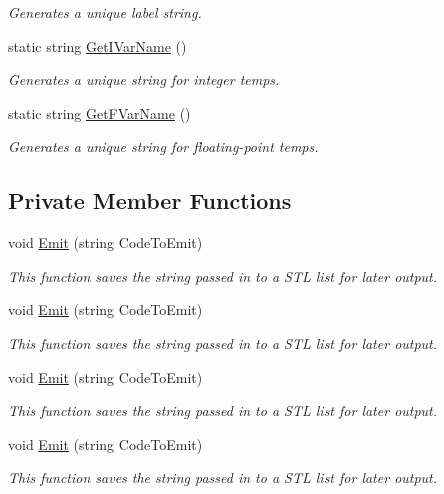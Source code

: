 \begin{DoxyCompactItemize}
\begin{DoxyCompactList}\small\item\em Generates a unique label string. \end{DoxyCompactList}\item 
\hypertarget{classTAC__Generator_a7a604278c753cac6332ed772de9f12ea}{static string \hyperlink{classTAC__Generator_a7a604278c753cac6332ed772de9f12ea}{Get\-I\-Var\-Name} ()}\label{classTAC__Generator_a7a604278c753cac6332ed772de9f12ea}

\begin{DoxyCompactList}\small\item\em Generates a unique string for integer temps. \end{DoxyCompactList}\item 
\hypertarget{classTAC__Generator_a1765369ef41d28a615bf3c50aded0319}{static string \hyperlink{classTAC__Generator_a1765369ef41d28a615bf3c50aded0319}{Get\-F\-Var\-Name} ()}\label{classTAC__Generator_a1765369ef41d28a615bf3c50aded0319}

\begin{DoxyCompactList}\small\item\em Generates a unique string for floating-\/point temps. \end{DoxyCompactList}\end{DoxyCompactItemize}
\subsection*{Private Member Functions}
\begin{DoxyCompactItemize}
\item 
void \hyperlink{classTAC__Generator_a8612e9fba451f0416e717dcf51a02977}{Emit} (string Code\-To\-Emit)
\begin{DoxyCompactList}\small\item\em This function saves the string passed in to a S\-T\-L list for later output. \end{DoxyCompactList}\item 
void \hyperlink{classTAC__Generator_a8612e9fba451f0416e717dcf51a02977}{Emit} (string Code\-To\-Emit)
\begin{DoxyCompactList}\small\item\em This function saves the string passed in to a S\-T\-L list for later output. \end{DoxyCompactList}\item 
void \hyperlink{classTAC__Generator_a8612e9fba451f0416e717dcf51a02977}{Emit} (string Code\-To\-Emit)
\begin{DoxyCompactList}\small\item\em This function saves the string passed in to a S\-T\-L list for later output. \end{DoxyCompactList}\item 
void \hyperlink{classTAC__Generator_a8612e9fba451f0416e717dcf51a02977}{Emit} (string Code\-To\-Emit)
\begin{DoxyCompactList}\small\item\em This function saves the string passed in to a S\-T\-L list for later output. \end{DoxyCompactList}\end{DoxyCompactItemize}
